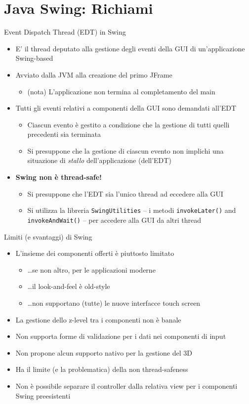 \documentclass[presentation]{beamer}
\begin{document}
\section{Java Swing: Richiami}

\begin{frame}{Event Dispatch Thread (EDT) in Swing}
\begin{itemize}\itemsep10pt
\item E' il thread deputato alla gestione degli eventi della GUI di un'applicazione Swing-based
\item Avviato dalla JVM alla creazione del primo JFrame
\begin{itemize}
\item (nota) L'applicazione non termina al completamento del main
\end{itemize}
\item Tutti gli eventi relativi a componenti della GUI sono demandati all'EDT
\begin{itemize}
\item Ciascun evento è gestito a condizione che la gestione di tutti quelli precedenti sia terminata
\item Si presuppone che la gestione di ciascun evento non implichi una situazione di \emph{stallo} dell'applicazione (dell'EDT)
\end{itemize}
\item \textbf{Swing non è thread-safe!}
\begin{itemize}
\item Si presuppone che l'EDT sia l'unico thread ad eccedere alla GUI
\item Si utilizza la libreria \texttt{SwingUtilities} -- i metodi \texttt{invokeLater()} and \texttt{invokeAndWait()} -- per accedere alla GUI da altri thread
\end{itemize}
\end{itemize}
\end{frame}

\begin{frame}{Limiti (e svantaggi) di Swing}
\begin{itemize}\itemsep10pt
\item L'insieme dei componenti offerti è piuttosto limitato
\begin{itemize}
\item \dots se non altro, per le applicazioni moderne
\item \dots il look-and-feel è old-style
\item \dots non supportano (tutte) le nuove interfacce touch screen
\end{itemize}
\item La gestione dello z-level tra i componenti non è banale
\item Non supporta forme di validazione per i dati nei componenti di input
\item Non propone alcun supporto nativo per la gestione del 3D
\item Ha il limite (e la problematica) della non thread-safeness
\item Non è possibile separare il controller dalla relativa view per i componenti Swing preesistenti
\end{itemize}
\end{frame}
\end{document}
